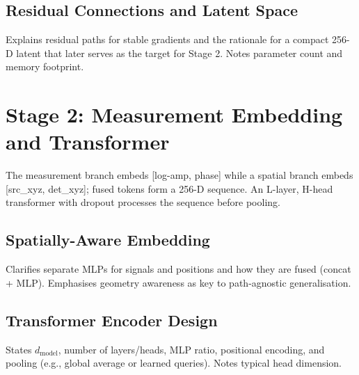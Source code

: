 
\subsection{Residual Connections and Latent Space}

Explains residual paths for stable gradients and the rationale for a compact 256-D latent that later serves as the target for Stage 2. Notes parameter count and memory footprint.


\section{Stage 2: Measurement Embedding and Transformer}

The measurement branch embeds [log-amp, phase] while a spatial branch embeds [src\_xyz, det\_xyz]; fused tokens form a 256-D sequence. An L-layer, H-head transformer with dropout processes the sequence before pooling.


\subsection{Spatially-Aware Embedding}

Clarifies separate MLPs for signals and positions and how they are fused (concat + MLP). Emphasises geometry awareness as key to path-agnostic generalisation.


\subsection{Transformer Encoder Design}

States $d_{\text{model}}$, number of layers/heads, MLP ratio, positional encoding, and pooling (e.g., global average or learned queries). Notes typical head dimension.

